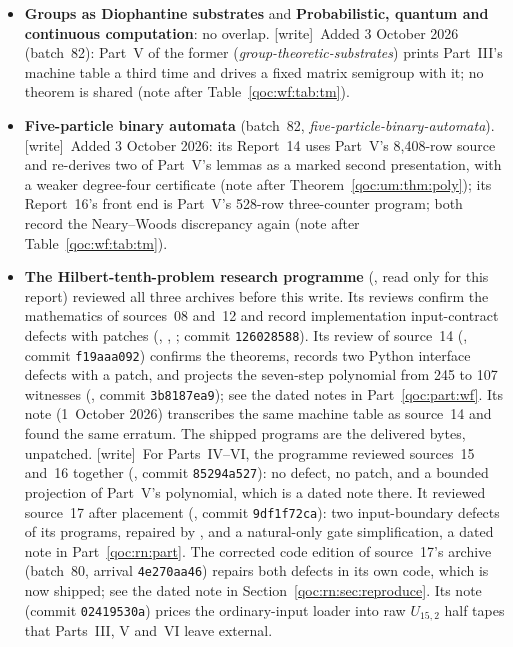 \documentclass[11pt,letterpaper]{article}
\theoremstyle{definition}
\theoremstyle{remark}
\newcommand{\wtag}{\textup{[write]}}
\begin{document}
\begin{itemize}
\item \textbf{Groups as Diophantine substrates} and \textbf{Probabilistic, quantum and continuous computation}: no overlap. \wtag\ Added 3 October 2026 (batch~82): Part~V of the former (\emph{group-theoretic-substrates}) prints Part~III's machine table a third time and drives a fixed matrix semigroup with it; no theorem is shared (note after Table~\ref{qoc:wf:tab:tm}).
\item \textbf{Five-particle binary automata} (batch~82, \emph{five-particle-binary-automata}). \wtag\ Added 3 October 2026: its Report~14 uses Part~V's 8,408-row source and re-derives two of Part~V's lemmas as a marked second presentation, with a weaker degree-four certificate (note after Theorem~\ref{qoc:um:thm:poly}); its Report~16's front end is Part~V's 528-row three-counter program; both record the Neary--Woods discrepancy again (note after Table~\ref{qoc:wf:tab:tm}).
\item \textbf{The Hilbert-tenth-problem research programme} (, read only for this report) reviewed all three archives before this write. Its reviews confirm the mathematics of sources~08 and~12 and record implementation input-contract defects with patches (, , ; commit \texttt{126028588}). Its review of source~14 (, commit \texttt{f19aaa092}) confirms the theorems, records two Python interface defects with a patch, and projects the seven-step polynomial from 245 to 107 witnesses (, commit \texttt{3b8187ea9}); see the dated notes in Part~\ref{qoc:part:wf}. Its note  (1~October 2026) transcribes the same machine table as source~14 and found the same erratum. The shipped programs are the delivered bytes, unpatched. \wtag\ For Parts~IV--VI, the programme reviewed sources~15 and~16 together (, commit \texttt{85294a527}): no defect, no patch, and a bounded projection of Part~V's polynomial, which is a dated note there. It reviewed source~17 after placement (, commit \texttt{9df1f72ca}): two input-boundary defects of its programs, repaired by , and a natural-only gate simplification, a dated note in Part~\ref{qoc:rn:part}. The corrected code edition of source~17's archive (batch~80, arrival \texttt{4e270aa46}) repairs both defects in its own code, which is now shipped; see the dated note in Section~\ref{qoc:rn:sec:reproduce}. Its note  (commit \texttt{02419530a}) prices the ordinary-input loader into raw $U_{15,2}$ half tapes that Parts~III, V and~VI leave external.

\end{itemize}
\end{document}
